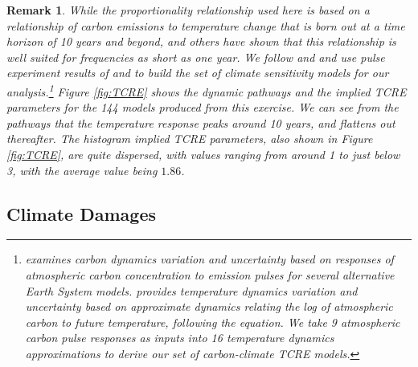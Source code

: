 \documentclass[12pt]{article}
\newtheorem{remark}[theorem]{Remark}
\begin{document}
\begin{remark}
    While the proportionality relationship used here is based on a relationship of carbon emissions to temperature change that is born out at a time horizon of 10 years and beyond, \cite{DietzVenmans:2019, BarnettBrockHansen:2021, barnett2023climate} and others have shown that this relationship is well suited for frequencies as short as one year. We follow \cite{BarnettBrockHansen:2021} and \cite{BarnettBrockHansenZhang:2023} and use pulse experiment results of \cite{Joosetal:2013} and \cite{Geoffroy:2013} to build the set of climate sensitivity models for our analysis.\footnote{\cite{Joosetal:2013} examines carbon dynamics variation and uncertainty based on responses of atmospheric carbon concentration to emission pulses for several alternative Earth System models. \cite{Geoffroy:2013} provides temperature dynamics variation and uncertainty based on approximate dynamics relating the log of atmospheric carbon to future temperature, following the \citeauthor{Arrhenius:1896} equation. We take 9 atmospheric carbon pulse responses as inputs into 16 temperature dynamics approximations to derive our set of carbon-climate TCRE models.} Figure \ref{fig:TCRE} shows the dynamic pathways and the implied TCRE parameters for the 144 models produced from this exercise. We can see from the pathways that the temperature response peaks around 10 years, and flattens out thereafter. The histogram implied TCRE parameters, also shown in Figure \ref{fig:TCRE}, are quite dispersed, with values ranging from around 1 to just below 3, with the average value being $1.86$.
\end{remark}



\subsection{Climate Damages}\label{section:damage_function}
\end{document}
